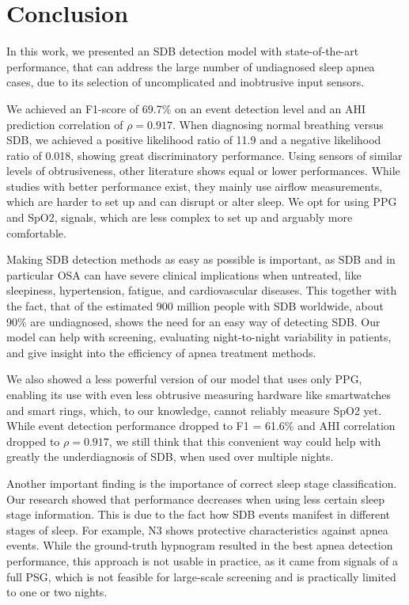 \chapter{Conclusion \label{Chapter-Conclusion}}

In this work, we presented an SDB detection model with state-of-the-art performance, that can address the large number of undiagnosed sleep apnea cases, due to its selection of uncomplicated and inobtrusive input sensors.

We achieved an F1-score of 69.7\% on an event detection level and an AHI prediction correlation of $\rho = 0.917$. When diagnosing normal breathing versus SDB, we achieved a positive likelihood ratio of 11.9 and a negative likelihood ratio of 0.018, showing great discriminatory performance.
Using sensors of similar levels of obtrusiveness, other literature shows equal or lower performances. 
While studies with better performance exist, they mainly use airflow measurements, which are harder to set up and can disrupt or alter sleep. We opt for using PPG and SpO2, signals, which are less complex to set up and arguably more comfortable.

Making SDB detection methods as easy as possible is important, as SDB and in particular OSA can have severe clinical implications when untreated, like sleepiness, hypertension, fatigue, and cardiovascular diseases. This together with the fact, that of the estimated 900 million people with SDB worldwide, about 90\% are undiagnosed, shows the need for an easy way of detecting SDB. Our model can help with screening, evaluating night-to-night variability in patients, and give insight into the efficiency of apnea treatment methods.

We also showed a less powerful version of our model that uses only PPG, enabling its use with even less obtrusive measuring hardware like smartwatches and smart rings, which, to our knowledge, cannot reliably measure SpO2 yet.
While event detection performance dropped to F1 = 61.6\% and AHI correlation dropped to $\rho = 0.917$, we still think that this convenient way could help with greatly the underdiagnosis of SDB, when used over multiple nights. 

Another important finding is the importance of correct sleep stage classification. Our research showed that performance decreases when using less certain sleep stage information. This is due to the fact how SDB events manifest in different stages of sleep. For example, N3 shows protective characteristics against apnea events. While the ground-truth hypnogram resulted in the best apnea detection performance, this approach is not usable in practice, as it came from signals of a full PSG, which is not feasible for large-scale screening and is practically limited to one or two nights.

